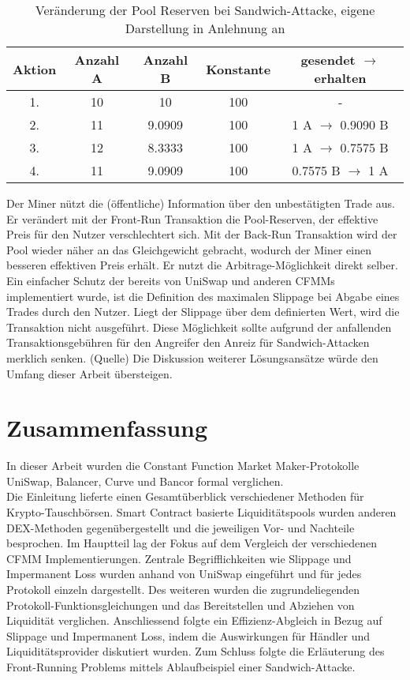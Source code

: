 \documentclass[12pt,a4paper,titlepage,oneside,english]{article}
\begin{document}
\begin{table}[h!]
  \center
  \begin{tabular}{|c|cccc|}       
    \hline
    Aktion & Anzahl A & Anzahl B & Konstante & gesendet $\rightarrow$ erhalten \\ \hline
    1. & 10 & 10 & 100 & - \\    
    2. & 11 & 9.0909  & 100  & 1 A $\rightarrow$ 0.9090 B \\ 
    3. & 12 & 8.3333 & 100 & 1 A $\rightarrow$ 0.7575 B \\
    4. & 11 & 9.0909 & 100 & 0.7575 B $\rightarrow$ 1 A \\
    \hline
  \end{tabular}
  \caption{Veränderung der Pool Reserven bei Sandwich-Attacke, eigene Darstellung in Anlehnung an \citet{Buterin2018} }
  \label{tbl:Sandwich}
\end{table}
Der Miner nützt die (öffentliche) Information über den unbestätigten Trade aus. Er verändert mit der Front-Run Transaktion die Pool-Reserven, der effektive Preis für den Nutzer verschlechtert sich. Mit der Back-Run Transaktion wird der Pool wieder näher an das Gleichgewicht gebracht, wodurch der Miner einen besseren effektiven Preis erhält. Er nutzt die Arbitrage-Möglichkeit direkt selber.
Ein einfacher Schutz der bereits von UniSwap und anderen CFMMs implementiert wurde, ist die Definition des maximalen Slippage bei Abgabe eines Trades durch den Nutzer.  Liegt der Slippage über dem definierten Wert, wird die Transaktion nicht ausgeführt. Diese Möglichkeit sollte aufgrund der anfallenden Transaktionsgebühren für den Angreifer den Anreiz für Sandwich-Attacken merklich senken. (Quelle) Die Diskussion weiterer Lösungsansätze würde den Umfang dieser Arbeit übersteigen. 

\section{Zusammenfassung}%


In dieser Arbeit wurden die Constant Function Market Maker-Protokolle UniSwap, Balancer, Curve und Bancor formal verglichen. \\
Die Einleitung lieferte einen Gesamtüberblick verschiedener Methoden für Krypto-Tauschbörsen. Smart Contract basierte Liquiditätspools wurden anderen DEX-Methoden gegenübergestellt und die jeweiligen Vor- und Nachteile besprochen.
Im Hauptteil lag der Fokus auf dem Vergleich der verschiedenen CFMM Implementierungen. Zentrale Begrifflichkeiten wie Slippage und Impermanent Loss wurden anhand von UniSwap eingeführt und für jedes Protokoll einzeln dargestellt. Des weiteren wurden die zugrundeliegenden Protokoll-Funktionsgleichungen und das Bereitstellen und Abziehen von Liquidität verglichen. 
Anschliessend folgte ein Effizienz-Abgleich in Bezug auf Slippage und Impermanent Loss, indem die Auswirkungen für Händler und Liquiditätsprovider diskutiert wurden. Zum Schluss folgte die Erläuterung des Front-Running Problems mittels Ablaufbeispiel einer Sandwich-Attacke. 
\end{document}
